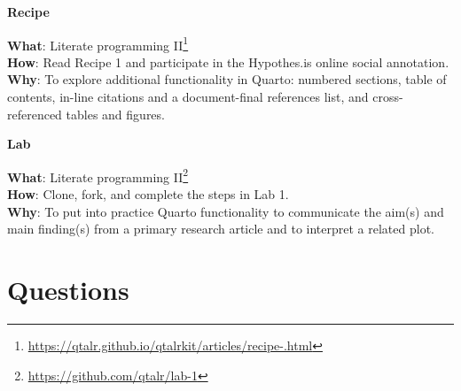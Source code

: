 \documentclass[
  letterpaper,
  DIV=11,
  numbers=noendperiod]{scrreport}
\theoremstyle{definition}
\theoremstyle{remark}
\DeclareRobustCommand{\href}[2]{#2\footnote{\url{#1}}}
\begin{document}
\begin{tcolorbox}[enhanced jigsaw, breakable, arc=.35mm, leftrule=.75mm, rightrule=.15mm, colback=white, toprule=.15mm, bottomrule=.15mm, opacityback=0, left=2mm]

\textbf{ Recipe}

\textbf{What}:
\href{https://qtalr.github.io/qtalrkit/articles/recipe-.html}{Literate
programming II}\\
\textbf{How}: Read Recipe 1 and participate in the Hypothes.is online
social annotation.\\
\textbf{Why}: To explore additional functionality in Quarto: numbered
sections, table of contents, in-line citations and a document-final
references list, and cross-referenced tables and figures.

\end{tcolorbox}

\begin{tcolorbox}[enhanced jigsaw, breakable, arc=.35mm, leftrule=.75mm, rightrule=.15mm, colback=white, toprule=.15mm, bottomrule=.15mm, opacityback=0, left=2mm]

\textbf{ Lab}

\textbf{What}: \href{https://github.com/qtalr/lab-1}{Literate
programming II}\\
\textbf{How}: Clone, fork, and complete the steps in Lab 1.\\
\textbf{Why}: To put into practice Quarto functionality to communicate
the aim(s) and main finding(s) from a primary research article and to
interpret a related plot.

\end{tcolorbox}

\hypertarget{questions}{%
\section*{Questions}\label{questions}}

\end{document}
